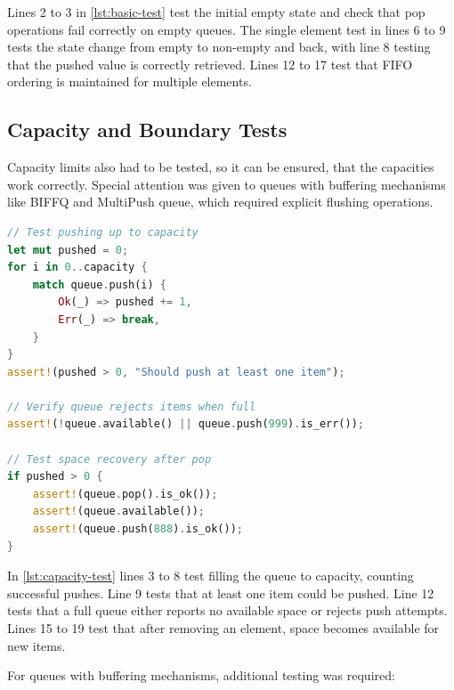 Lines 2 to 3 in \cref{lst:basic-test} test the initial empty state and check that pop operations fail correctly on empty queues. The single element test in lines 6 to 9 tests the state change from empty to non-empty and back, with line 8 testing that the pushed value is correctly retrieved. Lines 12 to 17 test that FIFO ordering is maintained for multiple elements.

\subsection{Capacity and Boundary Tests}
Capacity limits also had to be tested, so it can be ensured, that the capacities work correctly. Special attention was given to queues with buffering mechanisms like \ac{BIFFQ} and MultiPush queue, which required explicit flushing operations.

\begin{lstlisting}[language=Rust, style=boxed, caption={Capacity limit test pattern}, label={lst:capacity-test}]
// Test pushing up to capacity
let mut pushed = 0;
for i in 0..capacity {
    match queue.push(i) {
        Ok(_) => pushed += 1,
        Err(_) => break,
    }
}
assert!(pushed > 0, "Should push at least one item");

// Verify queue rejects items when full
assert!(!queue.available() || queue.push(999).is_err());

// Test space recovery after pop
if pushed > 0 {
    assert!(queue.pop().is_ok());
    assert!(queue.available());
    assert!(queue.push(888).is_ok());
}
\end{lstlisting}

In \cref{lst:capacity-test} lines 3 to 8 test filling the queue to capacity, counting successful pushes. Line 9 tests that at least one item could be pushed. Line 12 tests that a full queue either reports no available space or rejects push attempts. Lines 15 to 19 test that after removing an element, space becomes available for new items.

For queues with buffering mechanisms, additional testing was required:

